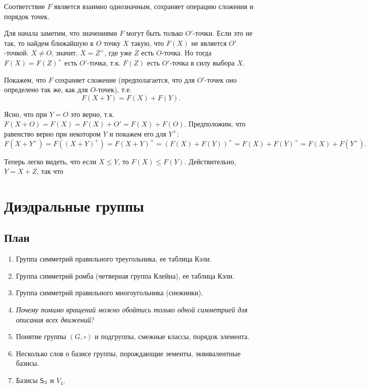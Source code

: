 \begin{thrm}
Соответствие $F$ является взаимно однозначным, сохраняет операцию сложения и порядок точек.
\end{thrm}
\pf
Для начала заметим, что значениями $F$ могут быть только $O'$-точки. Если это не так, то найдем ближайшую к $O$ точку $X$ такую, что $F(X)$ не является $O'$-точкой. $X\ne O$, значит, $X=Z^+$, где уже $Z$ есть $O$-точка. Но тогда $F(X)=F(Z)^+$ есть $O'$-точка, т.к. $F(Z)$ есть $O'$-точка в силу выбора $X$.

Покажем, что $F$ сохраняет сложение (предполагается, что для $O'$-точек оно определено так же, как для $O$-точек), т.е.
$$
F(X+Y)=F(X)+F(Y).
$$

Ясно, что при $Y=O$ это верно, т.к. $F(X+O)=F(X)=F(X)+O'=F(X)+F(O)$. Предположим, что равенство верно при некотором $Y$ и покажем его для $Y^+$:
$$
F(X+Y^+)=F((X+Y)^+)=F(X+Y)^+=(F(X)+F(Y))^+=F(X)+F(Y)^+=F(X)+F(Y^+).
$$

Теперь легко видеть, что если $X\le Y$, то $F(X)\le F(Y)$. Действительно, $Y=X+Z$, так что $ $



\epf







\section{Диэдральные группы}


\subsection{План}
\begin{enumerate}
\item Группа симметрий правильного треугольника, ее таблица Кэли.
\item Группа симметрий ромба (четверная группа Клейна), ее таблица Кэли.
\item Группа симметрий правильного многоугольника (снежинки).
\item \textit{Почему помимо вращений можно обойтись только одной симметрией для описания всех движений}?
\item Понятие группы $(G,\circ)$ и подгруппы, смежные классы, порядок элемента.
\item Несколько слов о базисе группы, порождающие эементы, эквивалентные базисы.
\item Базисы ${\mathsf{S}}_3$ и $V_4$.
\end{enumerate}

